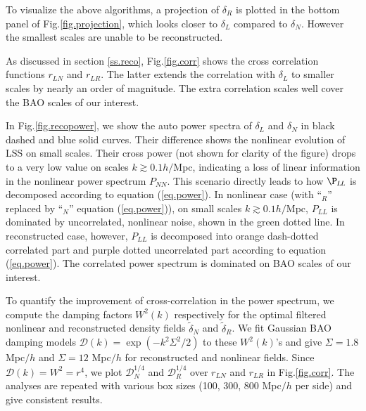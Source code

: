 \documentclass[aps,prd,twocolumn,superscriptaddress,amsfont,amssymb,amsmath,nofootinbib,showpacs,balancelastpage]{revtex4-1}
\begin{document}
To visualize the above algorithms, a projection of $\delta_R$ is plotted in
the bottom panel of Fig.\ref{fig.projection}, which looks closer to 
$\delta_L$ compared to $\delta_N$. However the smallest scales are unable
to be reconstructed.

As discussed in section \ref{ss.reco},
Fig.\ref{fig.corr} shows the cross correlation functions
$r_{LN}$ and $r_{LR}$. The latter extends the correlation
with $\delta_L$ to smaller scales by nearly an order of
magnitude. The extra correlation scales well cover the BAO
scales of our interest.

In Fig.\ref{fig.recopower}, we show the auto power spectra of
$\delta_L$ and $\delta_N$ in black dashed and blue solid curves.
Their difference shows the nonlinear evolution of LSS on 
small scales. Their cross power (not shown for clarity of the figure)
drops to a very low value on scales $k\gtrsim 0.1h/$Mpc,
indicating a loss of linear information in the
nonlinear power spectrum $P_{NN}$. This scenario directly
leads to how $\P_{LL}$ is decomposed according to equation
(\ref{eq.power}). In nonlinear case (with ``$_R$'' replaced
by ``$_N$'' equation (\ref{eq.power})), on small
scales $k\gtrsim 0.1h/$Mpc, $P_{LL}$ is dominated by
uncorrelated, nonlinear noise, shown in the green
dotted line. In reconstructed case, however, $P_{LL}$
is decomposed into orange dash-dotted correlated
part and purple dotted uncorrelated part according to
equation (\ref{eq.power}). The correlated power spectrum
is dominated on BAO scales of our interest.

To quantify the improvement of cross-correlation in the power
spectrum, we compute the 
damping factors $W^2(k)$ respectively for the optimal filtered 
nonlinear and reconstructed density fields $\tilde\delta_N$
and $\tilde\delta_R$.
We fit Gaussian BAO damping models
${\mathcal D}(k)=\exp(-k^2\Sigma^2/2)$ to these $W^2(k)$'s
and give $\Sigma=1.8$ Mpc$/h$ and $\Sigma=12$ 
Mpc$/h$ for reconstructed and nonlinear fields.
Since ${\mathcal D}(k)=W^2=r^4$, we plot
${\mathcal D}_N^{1/4}$ and ${\mathcal D}_R^{1/4}$
over $r_{LN}$ and $r_{LR}$ in Fig.\ref{fig.corr}.
The analyses are repeated with various box sizes (100, 300, 800 Mpc$/h$ per side)
and give consistent results.
\end{document}
